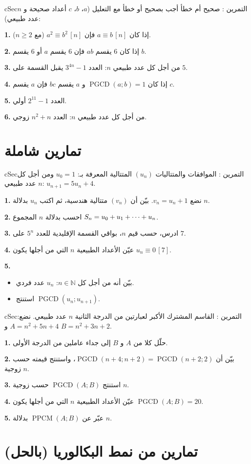 \documentclass[12pt,a4paper]{article}
\newenvironment{BOX}[2]{\begin{otherlanguage}{english}\begin{arbox}{#1}{#2}}{\end{arbox}\end{otherlanguage}}
\newcounter{exo}
\newenvironment{tamrin}[1]{\stepcounter{exo}\begin{BOX}{cSec}{التمرين \theexo: #1}}{\end{BOX}}
\renewcommand{\cdots}{\mathinner{\cdotp\cdotp\cdotp}}
\newcommand{\N}{\mathbb{N}}
\newcommand{\pgcd}{\operatorname{PGCD}}
\newcommand{\ppcm}{\operatorname{PPCM}}
\newenvironment{sq}{\begin{itemize}[leftmargin=2.4em,itemsep=3pt]}{\end{itemize}}
\newcommand{\qa}{\item[(أ)]}\newcommand{\qb}{\item[(ب)]}\newcommand{\qc}{\item[(جـ)]}\newcommand{\qd}{\item[(د)]}\newcommand{\qe}{\item[(هـ)]}
\newcommand{\QQ}[1]{\par\smallskip\textbf{#1.} }
\begin{document}
\begin{tamrin}{صحيح أم خطأ}
أجب بصحيح أو خطأ مع التعليل ($a$، $b$، $c$ أعداد صحيحة و $n$ عدد طبيعي):
\QQ{1} إذا كان $a\equiv b\,[n]$ فإن $a^2\equiv b^2\,[n]$ (مع $n\ge 2$).
\QQ{2} إذا كان $6$ يقسم $ab$ فإن $6$ يقسم $a$ أو $6$ يقسم $b$.
\QQ{3} من أجل كل عدد طبيعي $n$: العدد $3^{4n}-1$ يقبل القسمة على $5$.
\QQ{4} إذا كان $\pgcd(a;b)=1$ و $a$ يقسم $bc$ فإن $a$ يقسم $c$.
\QQ{5} العدد $2^{11}-1$ أولي.
\QQ{6} من أجل كل عدد طبيعي $n$: العدد $n^2+n$ زوجي.
\end{tamrin}

\section{تمارين شاملة}


\begin{tamrin}{الموافقات والمتتاليات}
$(u_n)$ المتتالية المعرفة بـ: $u_0=1$ ومن أجل كل عدد طبيعي $n$: $u_{n+1}=5u_n+4$.
\QQ{1} نضع $v_n=u_n+1$. بيّن أن $(v_n)$ متتالية هندسية، ثم اكتب $u_n$ بدلالة $n$.
\QQ{2} احسب بدلالة $n$ المجموع $S_n=u_0+u_1+\cdots+u_n$.
\QQ{3} ادرس، حسب قيم $n$، بواقي القسمة الإقليدية للعدد $5^n$ على $7$.
\QQ{4} عيّن الأعداد الطبيعية $n$ التي من أجلها يكون $u_n\equiv 0\,[7]$.
\QQ{5}
\begin{sq}
\qa بيّن أنه من أجل كل $n\in\N$: $u_n$ عدد فردي.
\qb استنتج $\pgcd(u_n;u_{n+1})$.
\end{sq}
\end{tamrin}

\begin{tamrin}{القاسم المشترك الأكبر لعبارتين من الدرجة الثانية}
$n$ عدد طبيعي. نضع: $A=n^2+5n+4$ و $B=n^2+3n+2$.
\QQ{1} حلّل كلا من $A$ و $B$ إلى جداء عاملين من الدرجة الأولى.
\QQ{2} بيّن أن $\pgcd(n+4;n+2)=\pgcd(n+2;2)$، واستنتج قيمته حسب زوجية $n$.
\QQ{3} استنتج $\pgcd(A;B)$ حسب زوجية $n$.
\QQ{4} عيّن الأعداد الطبيعية $n$ التي من أجلها يكون $\pgcd(A;B)=20$.
\QQ{5} عبّر عن $\ppcm(A;B)$ بدلالة $n$.
\end{tamrin}

\section{تمارين من نمط البكالوريا (بالحل)}
\end{document}
